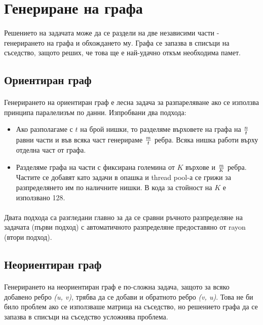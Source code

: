 \section{Генериране на графа}

\paragraph*{} Решението на задачата може да се раздели на две независими части - генерирането на графа и обхождането му. Графа се запазва в списъци на съседство, защото реших, че това ще е най-удачно откъм необходима памет.

\subsection{Ориентиран граф}

\paragraph*{} Генерирането на ориентиран граф е лесна задача за разпареляване ако се използва принципа паралелизъм по данни. Изпробвани два подхода:

\begin{itemize}
\item Ако разполагаме с $t$ на брой нишки, то разделяме върховете на графа на $n \over t$ равни части и във всяка част генерираме $m \over t$ ребра. Всяка нишка работи върху отделна част от графа.
\item Разделяме графа на части с фиксирана големина от $K$ върхове и $m \over K$ ребра. Частите се добавят като задачи в опашка и thread pool-а се грижи за разпределянето им по наличните нишки. В кода за стойност на $K$ е използвано 128.
\end{itemize}

\paragraph*{} Двата подхода са разгледани главно за да се сравни ръчното разпределяне на задачата (първи подход) с автоматичното разпределяне предоставяно от rayon (втори подход).

\subsection{Неориентиран граф}

\paragraph*{} Генерирането на неориентиран граф е по-сложна задача, защото за всяко добавено ребро \textit{(u, v)}, трябва да се добави и обратното ребро \textit{(v, u)}. Това не би било проблем ако се използваше матрица на съседство, но решението графа да се запазва в списъци на съседство усложнява проблема.

